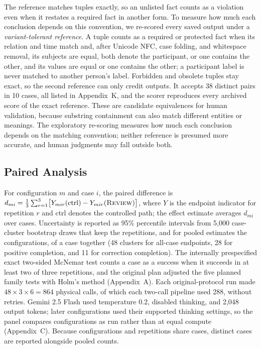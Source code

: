 \documentclass[acmsmall,review]{acmart}
\newcommand{\rulesub}[1]{\text{\textsc{#1}}}
\begin{document}
The reference matches tuples exactly, so an unlisted fact counts as a violation even when it restates a required fact in another form. To measure how much each conclusion depends on this convention, we re-scored every saved output under a \emph{variant-tolerant reference}. A tuple counts as a required or protected fact when its relation and time match and, after Unicode NFC, case folding, and whitespace removal, its subjects are equal, both denote the participant, or one contains the other, and its values are equal or one contains the other; a participant label is never matched to another person's label. Forbidden and obsolete tuples stay exact, so the second reference can only credit outputs. It accepts 38 distinct pairs in 10 cases, all listed in Appendix~K, and the scorer reproduces every archived score of the exact reference. These are candidate equivalences for human validation, because substring containment can also match different entities or meanings. The exploratory re-scoring measures how much each conclusion depends on the matching convention; neither reference is presumed more accurate, and human judgments may fall outside both.

\subsection{Paired Analysis}\label{sec:analysis}
For configuration $m$ and case $i$, the paired difference is $d_{mi}=\tfrac{1}{3}\sum_{r=1}^{3}\bigl[Y_{mir}(\mathrm{ctrl})-Y_{mir}(\rulesub{Review})\bigr]$, where $Y$ is the endpoint indicator for repetition $r$ and ctrl denotes the controlled path; the effect estimate averages $d_{mi}$ over cases. Uncertainty is reported as 95\% percentile intervals from 5,000 case-cluster bootstrap draws that keep the repetitions, and for pooled estimates the configurations, of a case together (48 clusters for all-case endpoints, 28 for positive completion, and 11 for correction completion). The internally prespecified exact two-sided McNemar test counts a case as a success when it succeeds in at least two of three repetitions, and the original plan adjusted the five planned family tests with Holm's method (Appendix~A). Each original-protocol run made $48\times3\times6=864$ physical calls, of which each two-call pipeline used 288, without retries. Gemini 2.5 Flash used temperature 0.2, disabled thinking, and 2,048 output tokens; later configurations used their supported thinking settings, so the panel compares configurations as run rather than at equal compute (Appendix~C). Because configurations and repetitions share cases, distinct cases are reported alongside pooled counts.
\end{document}
